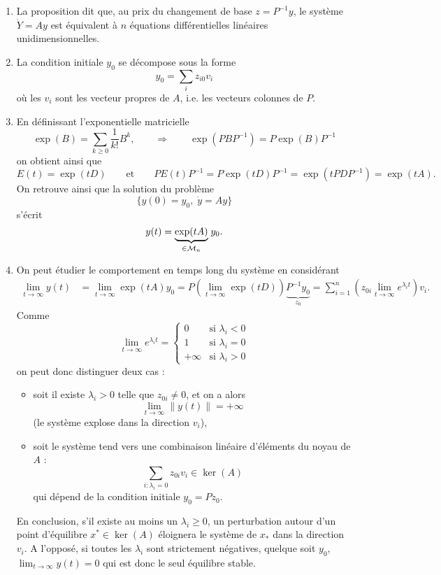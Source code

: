 \remark
\begin{enumerate}
  \item La proposition dit que, au prix du changement de base $z = P^{-1} y$, le système $\dot Y = A y$ est équivalent à $n$ équations différentielles linéaires unidimensionnelles.
  \item La condition initiale $y_0$ se décompose sous la forme
  $$
  y_0 = \sum_i z_{i0} v_i
  $$
  où les $v_i$ sont les vecteur propres de $A$, i.e. les vecteurs colonnes de $P$.
  \item En définissant l'exponentielle matricielle
  $$
  \exp(B) = \sum_{k \geq 0} \frac1{k!} B^k,
  \qquad \Rightarrow \qquad
  \exp(P B P^{-1}) = P \exp(B) P^{-1}
  $$
  on obtient ainsi que
  $$
  E(t) = \exp(t D) 
  \qquad \text{et} \qquad 
  P E(t) P^{-1} = P \exp(t D) P^{-1} = \exp(t P D P^{-1}) = \exp(t A).
  $$
  On retrouve ainsi que la solution du problème
  $$
  \{y(0) = y_0, \; \dot y = A y\}
  $$
  s'écrit
  $$
  y(t) = \underset{\in \mathcal{M}_n}{\underbrace{\exp(t A)}} \; y_0.
  $$
  \item On peut étudier le comportement en temps long du système en considérant
  \begin{align*}
    \lim_{t \rightarrow \infty} y(t)
    & = \lim_{t \rightarrow \infty} \exp(t A) y_0 
    = P \left(\lim_{t \rightarrow \infty} \exp(t D)\right) \underset{z_0}{\underbrace{P^{-1} y_0}}
    = \sum_{i=1}^n \left(z_{0i} \lim_{t \rightarrow \infty} e^{\lambda_i t}\right) v_i.
  \end{align*}
  Comme
  $$
  \lim_{t \rightarrow \infty} e^{\lambda_i t} = 
  \left\{\begin{array}{rr}
          0 & \text{si } \lambda_i < 0 \\
          1 & \text{si } \lambda_i = 0 \\
          +\infty & \text{si } \lambda_i > 0
         \end{array}\right.
  $$
  on peut donc distinguer deux cas : 
  \begin{itemize}
  \item soit il existe $\lambda_i > 0$ telle que $z_{0i} \neq 0$, et on a alors
  $$
  \lim_{t \rightarrow \infty} \|y(t)\| = + \infty
  $$
  (le système explose dans la direction $v_i$), 
  \item soit le système tend vers une combinaison linéaire d'éléments du noyau de $A$ :
  $$
  \sum_{i : \lambda_i = 0} z_{0i} v_i \in \ker(A)
  $$
  qui dépend de la condition initiale $y_0 = P z_0$.
  \end{itemize}
  En conclusion, s'il existe au moins un $\lambda_i \geq 0$, un perturbation autour d'un point d'équilibre $x^* \in \ker(A)$ éloignera le système de $x_ *$ dans la direction $v_i$. A l'opposé, si toutes les $\lambda_i$ sont strictement négatives, quelque soit $y_0$, $\lim_{t \rightarrow \infty} y(t) = 0$ qui est donc le seul équilibre stable.
\end{enumerate}

